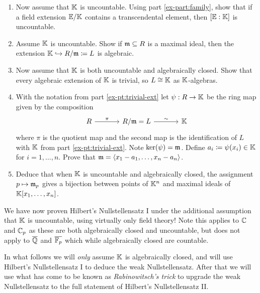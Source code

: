 \documentclass[12pt,reqno]{amsart}
\begin{document}
\begin{enumerate}[leftmargin=*]
\begin{enumerate}[label=(\alph*),ref=\theenumi\alph*]
\item Now assume that $\mathbb{K}$ is uncountable. Using part \ref{ex-part:family}, show that if a field extension $\mathbb{E}/\mathbb{K}$ contains a transcendental element, then $[\mathbb{E}:\mathbb{K}]$ is uncountable.
\item Assume $\mathbb{K}$ is uncountable. Show if $\mathfrak{m} \subseteq R$ is a maximal ideal, then the extension $\mathbb{K} \hookrightarrow R/\mathfrak{m}\coloneqq L$ is algebraic.
\item\label{ex-pt:trivial-ext} Now assume that $\mathbb{K}$ is both uncountable and algebraically closed. Show that every algebraic extension of $\mathbb{K}$ is trivial, so $L\cong \mathbb{K}$ as $\mathbb{K}$-algebras.
\item With the notation from part \ref{ex-pt:trivial-ext} let $\psi:R \to \mathbb{K}$ be the ring map given by the composition
\[
\begin{tikzcd}[row sep = .5em, column sep = 3.5em]
R \arrow[r,"\pi"] & R/\fm = L \arrow[r,"\sim"] & \KK
\end{tikzcd}
\]
where $\pi$ is the quotient map and the second map is the identification of $L$ with $\mathbb{K}$ from part \ref{ex-pt:trivial-ext}.  Note $\ker(\psi)= \mathfrak{m}$. Define $a_i\coloneqq \psi(x_i) \in \mathbb{K}$ for $i=1,\ldots,n$. Prove that $\mathfrak{m}=\langle x_1-a_1,\ldots,x_n-a_n\rangle$.

\item Deduce that when $\mathbb{K}$ is uncountable and algebraically closed, the assignment $p\mapsto \mathfrak{m}_p$ gives a bijection between points of $\mathbb{K}^n$ and maximal ideals of $\mathbb{K}[x_1,\ldots,x_n]$.
\end{enumerate}

\end{enumerate}

\hrulefill

We have now proven Hilbert's Nullstellensatz I under the additional assumption that $\mathbb{K}$ is uncountable, using virtually only field theory! Note this applies to $\mathbb{C}$ and $\mathbb{C}_{p}$ as these are both algebraically closed and uncountable, but does not apply to $\overline{\mathbb{Q}}$ and $\overline{\mathbb{F}_{p}}$ which while algebraically closed are countable. 

In what follows we will \emph{only} assume $\mathbb{K}$ is algebraically closed, and will use Hilbert's Nullstellensatz I to deduce the weak Nullstellensatz. After that we will use what has come to be known as \emph{Rabinowitsch's trick} to upgrade the weak Nullstellensatz to the full statement of Hilbert's Nullstellensatz II. 

\hrulefill
\end{document}
